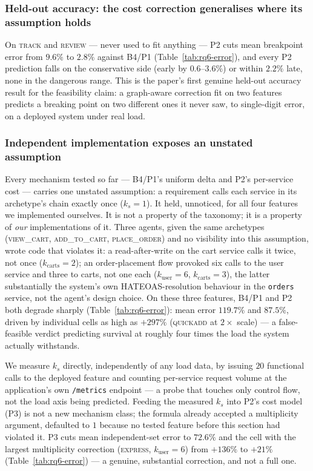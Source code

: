 \documentclass[journal, 10pt]{IEEEtran}
\begin{document}
\subsubsection{Held-out accuracy: the cost correction generalises where its assumption holds}
\label{sec:rq6-heldout}
On \textsc{track} and \textsc{review} --- never used to fit anything --- P2
cuts mean breakpoint error from $9.6\%$ to $2.8\%$ against B4/P1
(Table~\ref{tab:rq6-error}), and every P2 prediction falls on the conservative
side (early by $0.6$--$3.6\%$) or within $2.2\%$ late, none in the dangerous
range. This is the paper's first genuine held-out accuracy result for the
feasibility claim: a graph-aware correction fit on two features predicts a
breaking point on two different ones it never saw, to single-digit error, on
a deployed system under real load.

\subsubsection{Independent implementation exposes an unstated assumption}
\label{sec:rq6-independent}
Every mechanism tested so far --- B4/P1's uniform delta and P2's per-service
cost --- carries one unstated assumption: a requirement calls each service in
its archetype's chain exactly once ($k_s=1$). It held, unnoticed, for all four
features we implemented ourselves. It is not a property of the taxonomy; it is
a property of \emph{our} implementations of it. Three agents, given the same
archetypes (\textsc{view\_cart}, \textsc{add\_to\_cart}, \textsc{place\_order})
and no visibility into this assumption, wrote code that violates it: a
read-after-write on the cart service calls it twice, not once
($k_{\text{carts}}=2$); an order-placement flow provoked six calls to the user
service and three to carts, not one each ($k_{\text{user}}=6$,
$k_{\text{carts}}=3$), the latter substantially the system's own
HATEOAS-resolution behaviour in the \texttt{orders} service, not the agent's
design choice. On these three features, B4/P1 and P2 both degrade sharply
(Table~\ref{tab:rq6-error}): mean error $119.7\%$ and $87.5\%$, driven by
individual cells as high as $+297\%$ (\textsc{quickadd} at $2\times$ scale) ---
a false-feasible verdict predicting survival at roughly four times the load
the system actually withstands.

We measure $k_s$ directly, independently of any load data, by issuing $20$
functional calls to the deployed feature and counting per-service request
volume at the application's own \texttt{/metrics} endpoint --- a probe that
touches only control flow, not the load axis being predicted. Feeding the
measured $k_s$ into P2's cost model (P3) is not a new mechanism class; the
formula already accepted a multiplicity argument, defaulted to $1$ because no
tested feature before this section had violated it. P3 cuts mean independent-set
error to $72.6\%$ and the cell with the largest multiplicity correction
(\textsc{express}, $k_{\text{user}}=6$) from $+136\%$ to $+21\%$
(Table~\ref{tab:rq6-error}) --- a genuine, substantial correction, and
not a full one.
\end{document}
